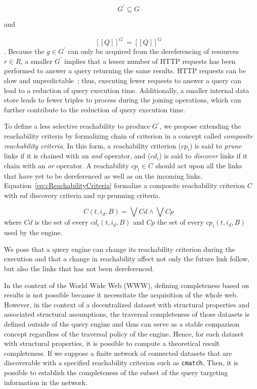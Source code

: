 \begin{equation}\label{eq:subsetDKG}
G^{\prime} \subseteq G
\end{equation}

and 

\begin{equation}\label{eq:evalQueryStructuralAssumption}
   [\![ Q ]\!]^{G^{\prime}} = [\![ Q ]\!]^{G}
\end{equation}
.
Because the $g \in G^{\prime}$ can only be acquired from the dereferencing of resources $r \in R$, a smaller $G^\prime$ implies that a lesser number of HTTP requests has been performed to answer a query
returning the same results.
HTTP requests can be slow and unpredictable~\cite{hartig2016walking}; thus, executing fewer requests to answer a query can lead to a reduction of query execution time.
Additionally, a smaller internal data store leads to fewer triples to process during the joining operations, which can further contribute to the reduction of query execution time.

To define a less selective reachability to produce $G^{\prime}$, we propose extending the reachability criteria by formalizing chain of criterion in a concept called \emph{composite reachability criteria}.
In this form, a reachability criterion ($cp_i$) is said to \emph{prune} links if it is chained with an \emph{and} operator, and ($cd_i$) is said to \emph{discover} links if it chain with an \emph{or} operator.
A reachability $cp_i \in C$ should act upon all the links that have yet to be dereferenced as well as on the incoming links.
Equation~\ref{eq:cReachabilityCriteria} formalize a composite reachability criterion $C$ with $nd$ discovery criteria and $np$ prunning criteria.

\begin{equation}\label{eq:cReachabilityCriteria}
    C(t, i_d, B)  = \bigvee Cd \land \bigvee Cp
\end{equation}
where $Cd$ is the set of every $cd_i(t, i_d, B)$ and $Cp$ the set of every $cp_i(t, i_d, B)$ used by the engine. 

We pose that a query engine can change its reachability criterion during the execution and that a change in  reachability affect not only the future link follow,
but also the links that has not been dereferenced.
\iffalse
Maybe refer to the link queue here in a footnote.
\fi

\iffalse
In the context of the World Wide Web (WWW), defining completeness based on results is not possible because it necessitate the acquisition of the whole web.
However, in the context of a decentralized dataset with structural properties and associated structural assumptions,
the traversal completeness of those datasets is defined outside of the query engine and thus can serve as a 
stable comparison concept regardless of the traversal policy of the engine.
Hence, for each dataset with structural properties, it is possible to compute a theoretical result completeness.
If we suppose a finite network of connected datasets that are discoverable with a specified reachability criterion such as \texttt{cmatch},
Then, it is possible to establish the completeness of the subset of the query targeting information in the network.



